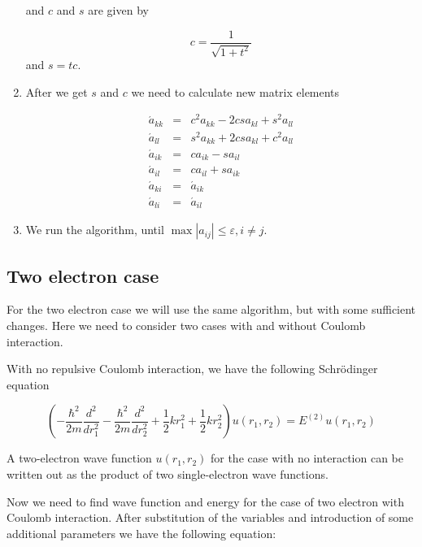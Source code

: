\documentclass[10pt]{article}
\begin{document}
\begin{enumerate}
and $c$ and $s$ are given by

\begin{equation}
c=\frac{1}{\sqrt{1+t^{2}}}
\end{equation}
and $s=tc$. 

\item 
After we get $s$ and $c$ we need to calculate new matrix elements



\begin{eqnarray*}
\acute{a}_{kk} &=&c^{2}a_{kk}-2csa_{kl}+s^{2}a_{ll} \\
\acute{a}_{ll} &=&s^{2}a_{kk}+2csa_{kl}+c^{2}a_{ll} \\
\acute{a}_{ik} &=&ca_{ik}-sa_{il} \\
\acute{a}_{il} &=&ca_{il}+sa_{ik} \\
\acute{a}_{ki} &=&\acute{a}_{ik} \\
\acute{a}_{li} &=&\acute{a}_{il}
\end{eqnarray*}

\item We run the algorithm, until $\max \left\vert a_{ij}\right\vert \leq
\varepsilon ,i\neq j.$ 
\end{enumerate}

\subsection{Two electron case}
For the two electron case  we will use the same algorithm, but with some
sufficient changes. Here we need to consider two cases with and without
Coulomb interaction.

With no repulsive Coulomb interaction, we have the following Schr\"{o}dinger
equation

\begin{equation}
	\left( -\frac{\hbar ^{2}}{2m}\frac{d^{2}}{dr_{1}^{2}}-\frac{\hbar ^{2}}{2m}%
	\frac{d^{2}}{dr_{2}^{2}}+\frac{1}{2}kr_{1}^{2}+\frac{1}{2}kr_{2}^{2}\right)
	u(r_{1},r_{2})=E^{(2)}u(r_{1},r_{2})
\end{equation}


	A two-electron wave function $u(r_{1},r_{2})$ for the case with no
	interaction can be written out as the product of two single-electron wave
	functions.
	
	Now we need to find wave function and energy for the case of two electron
	with Coulomb interaction. After substitution of the variables and
	introduction of some additional parameters we have the following equation:
	
\end{document}
